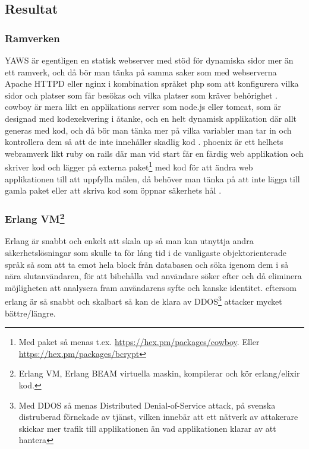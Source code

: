 \documentclass[12pt]{article}
\begin{document}
\subsection{ Resultat}
\subsubsection*{Ramverken}
YAWS är egentligen en statisk webserver med stöd för dynamiska sidor mer än ett ramverk, och då bör man tänka på samma saker som med webserverna Apache HTTPD eller nginx i kombination språket php som att konfigurera vilka sidor och platser som får besökas och vilka platser som kräver behörighet \cite{yaws}.
cowboy är mera likt en applikations server som node.js eller tomcat, som är designad med kodexekvering i åtanke, och en helt dynamisk applikation där allt generas med kod, och då bör man tänka mer på vilka variabler man tar in och kontrollera dem så att de inte innehåller skadlig kod \cite{cowboy}.
phoenix är ett helhets webramverk likt ruby on rails där man vid start får en färdig web applikation och skriver kod och lägger på externa paket\footnote{Med paket så menas t.ex.
\url{https://hex.pm/packages/cowboy}.
Eller \url{https://hex.pm/packages/bcrypt}} med kod för att ändra web applikationen till att uppfylla målen, då behöver man tänka på att inte lägga till gamla paket eller att skriva kod som öppnar säkerhets hål \cite{phoenix/ruby,phoenix/rails,phoenix}.
\subsubsection*{Erlang VM\footnote{Erlang VM, Erlang BEAM virtuella maskin, kompilerar och kör erlang/elixir kod\cite{erlang}.}}
	Erlang är snabbt och enkelt att skala up så man kan utnyttja andra säkerhetslösningar som skulle ta för lång tid i de vanligaste objektorienterade språk  så som att ta emot hela block från databasen och söka igenom dem i så nära slutanvändaren, för att bibehålla vad användare söker efter och då eliminera möjligheten att analysera fram användarens syfte och kanske identitet\cite{database}.
eftersom erlang är så snabbt och skalbart så kan de klara av DDOS\footnote{Med DDOS så menas Distributed Denial-of-Service attack, på svenska distruberad förnekade av tjänst, vilken innebär att ett nätverk av attakerare skickar mer trafik till applikationen än vad applikationen klarar av att hantera} attacker mycket bättre/längre.\cite{resource-safe}
\end{document}
